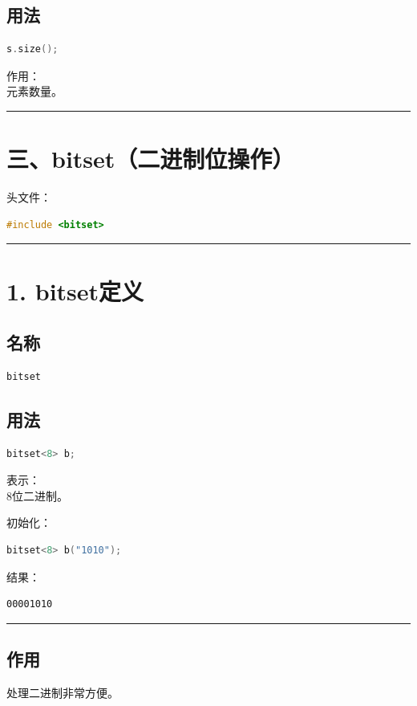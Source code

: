 \documentclass[9pt,twocolumn]{extarticle}
\begin{document}
\subsection{用法}
\begin{lstlisting}[language=C++]
s.size();
\end{lstlisting}
作用：\\
元素数量。

\noindent\rule{\linewidth}{0.4pt}

\section{三、bitset（二进制位操作）}

头文件：
\begin{lstlisting}[language=C++]
#include <bitset>
\end{lstlisting}

\noindent\rule{\linewidth}{0.4pt}

\section{1. bitset定义}

\subsection{名称}
\begin{lstlisting}[language=C++]
bitset
\end{lstlisting}

\subsection{用法}
\begin{lstlisting}[language=C++]
bitset<8> b;
\end{lstlisting}
表示：\\
8位二进制。

初始化：
\begin{lstlisting}[language=C++]
bitset<8> b("1010");
\end{lstlisting}
结果：
\begin{lstlisting}
00001010
\end{lstlisting}

\noindent\rule{\linewidth}{0.4pt}

\subsection{作用}
处理二进制非常方便。
\end{document}
